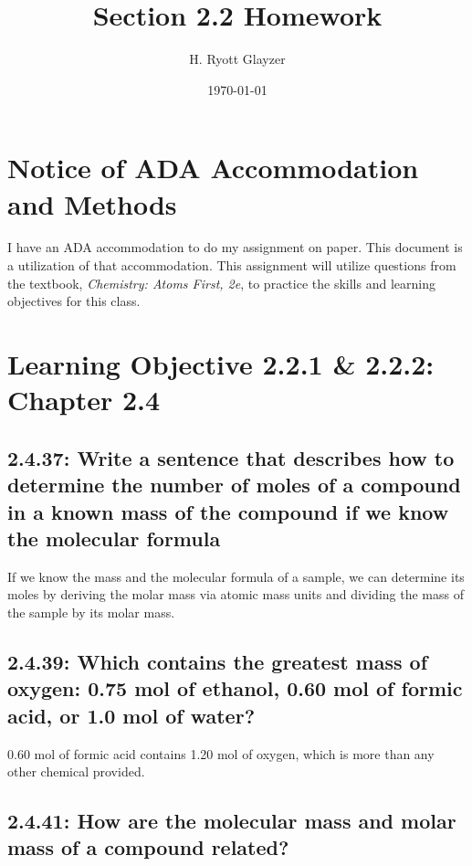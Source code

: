 \documentclass[11pt, letterpaper]{article}
\begin{document}


\title{Section 2.2 Homework}
\author{H. Ryott Glayzer}
\date{\today}


\maketitle


\section*{Notice of ADA Accommodation and Methods}
I have an ADA accommodation to do my assignment on paper.
This document is a utilization of that accommodation.
This assignment will utilize questions from the textbook,
\textit{Chemistry: Atoms First, 2e}, to practice the skills
and learning objectives for this class.

\section*{Learning Objective 2.2.1 \& 2.2.2: Chapter 2.4}
\subsection*{2.4.37: Write a sentence that describes how to determine the number of
moles of a compound in a known mass of the compound if we know the molecular formula}

If we know the mass and the molecular formula of a sample, we can determine its moles
by deriving the molar mass via atomic mass units and dividing the mass of the sample 
by its molar mass.

\subsection*{2.4.39: Which contains the greatest mass of oxygen: 0.75 mol of ethanol,
0.60 mol of formic acid, or 1.0 mol of water?}

0.60 mol of formic acid contains 1.20 mol of oxygen, which is more than any other
chemical provided.

\subsection*{2.4.41: How are the molecular mass and molar mass of a compound related?}
\end{document}
